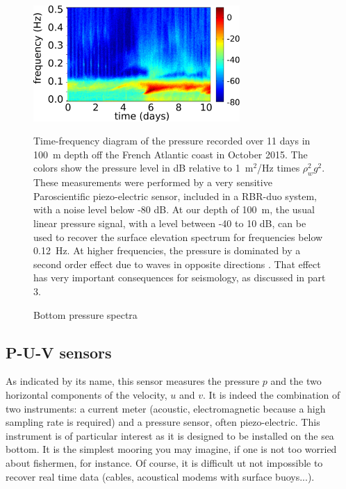 \begin{figure}[htb]
\centerline{\includegraphics[width=0.7\textwidth]{FIGS_CH_MEASUREMENTS/pressure_with_2ndorder.pdf}}
  \caption{Bottom pressure spectra}
    {Time-frequency diagram of the pressure recorded over 11 days in 100~m depth off the French Atlantic coast in October 2015.  The colors show the pressure level in dB relative 
    to 1~m$^2$/Hz times $\rho_w^2 g^2$. These measurements were performed by a very sensitive Paroscientific piezo-electric sensor, included in a RBR-duo 
    system, with a noise level below -80 dB. At our depth of 100~m, the usual linear pressure signal, with a level between -40 to 10 dB, can be used to recover 
    the surface elevation spectrum for frequencies below 0.12~Hz. At higher frequencies, the pressure is dominated by a second order effect due 
    to waves in opposite directions \citep[e.g.][]{Miche1944b,Ardhuin&al.2013}. That effect has very important consequences for seismology, as discussed in part 3.} \label{fig:pressure_with_2ndorder}
\end{figure}

 
\subsection{P-U-V sensors}
As indicated by its name, this sensor measures the pressure $p$ and the two horizontal components of the velocity, $u$ and $v$. It is indeed the 
combination of two instruments: a current meter (acoustic, electromagnetic because a high sampling rate is required) and a pressure sensor, often 
piezo-electric. This instrument is of particular interest as it is designed to be installed on the sea bottom. It is the simplest mooring you may imagine, if one 
is not too worried about fishermen, for instance. Of course, it is difficult ut not impossible to recover real time data (cables, acoustical modems with surface buoys...).

